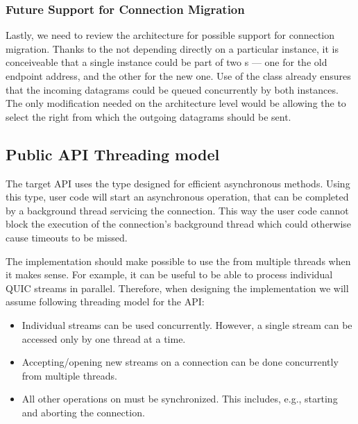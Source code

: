 \subsubsection{Future Support for Connection Migration}

Lastly, we need to review the architecture for possible support for connection migration. Thanks to
the \QuicConnectionContext{} not depending directly on a particular \Socket{} instance, it is
conceiveable that a single \QuicConnectionContext{} instance could be part of two
\QuicSocketContext{}s --- one for the old endpoint address, and the other for the new one. Use of the
 class already ensures that the incoming datagrams could be queued concurrently by
both \QuicSocketContext{} instances. The only modification needed on the architecture level would be
allowing the \QuicConnectionContext{} to select the right \Socket{} from which the outgoing
datagrams should be sent.

\subsection{Public API Threading model}

The target API uses the  type designed for efficient asynchronous methods. Using
this type, user code will start an asynchronous operation, that can be completed by a background
thread servicing the connection. This way the user code cannot block the execution of the
connection's background thread which could otherwise cause timeouts to be missed.

The implementation should make possible to use the \QuicConnection{} from multiple threads when
it makes sense. For example, it can be useful to be able to process individual QUIC streams in
parallel. Therefore, when designing the implementation we will assume following threading model for
the API:

\begin{itemize}

  \item Individual streams can be used concurrently. However, a single stream can be
    accessed only by one thread at a time.

  \item Accepting/opening new streams on a connection can be done concurrently from multiple threads.

  \item All other operations on \QuicConnection{} must be synchronized. This includes, e.g.,
    starting and aborting the connection.

\end{itemize}

